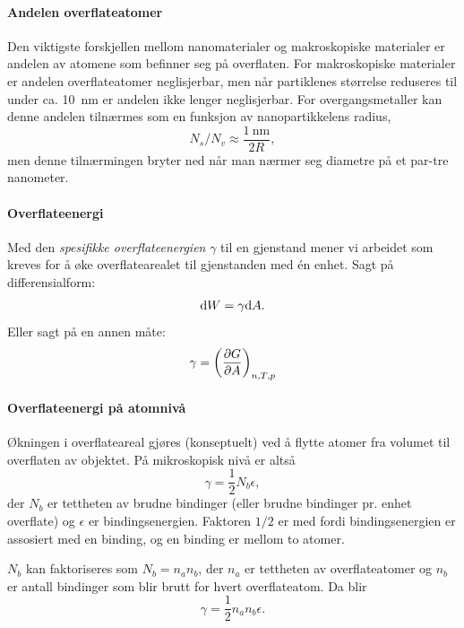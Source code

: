 \paragraph{Andelen overflateatomer} Den viktigste forskjellen mellom nanomaterialer og makroskopiske materialer er andelen av atomene som befinner seg på overflaten. For makroskopiske materialer er andelen overflateatomer neglisjerbar, men når partiklenes størrelse reduseres til under ca. \SI{10}{\nano\meter} er andelen ikke lenger neglisjerbar. For overgangsmetaller kan denne andelen tilnærmes som en funksjon av nanopartikkelens radius,
\begin{equation}
	N_s/N_v \approx \frac{\SI{1}{\nano\meter}}{2R},
\end{equation}
men denne tilnærmingen bryter ned når man nærmer seg diametre på et par-tre nanometer.

\paragraph{Overflateenergi} Med den \emph{spesifikke overflateenergien} $\gamma$ til en gjenstand mener vi arbeidet som kreves for å øke overflatearealet til gjenstanden med én enhet. Sagt på differensialform:
\begin{equation}
	\label{eq:surface_work}
	\text{d}W = \gamma \text{d}A.
\end{equation}
Eller sagt på en annen måte:
\begin{equation}
	\label{eq:surface_work_alt}
	\gamma = \left(\frac{\partial G}{\partial A}\right)_{n,T,p}
\end{equation}

\paragraph{Overflateenergi på atomnivå} Økningen i overflateareal gjøres (konseptuelt) ved å flytte atomer fra volumet til overflaten av objektet. På mikroskopisk nivå er altså 
\begin{equation}
	\label{eq:gamma_microscopic}
	\gamma = \frac{1}{2}N_b\epsilon,
\end{equation}
der $N_b$ er tettheten av brudne bindinger (eller brudne bindinger pr. enhet overflate) og $\epsilon$ er bindingsenergien. Faktoren $1/2$ er med fordi bindingsenergien er assosiert med en binding, og en binding er mellom to atomer.

$N_b$ kan faktoriseres som $N_b=n_an_b$, der $n_a$ er tettheten av overflateatomer og $n_b$ er antall bindinger som blir brutt for hvert overflateatom. Da blir
\begin{equation}
	\label{eq:gamma_microscopic_expanded}
	\gamma = \frac{1}{2}n_an_b\epsilon.
\end{equation}

